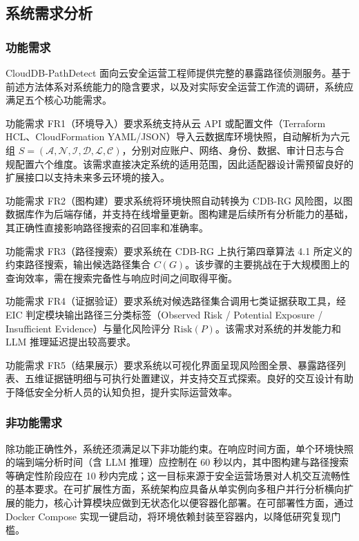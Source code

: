 \documentclass[a4paper,12pt]{ctexart}
\begin{document}
\subsection{系统需求分析}

\subsubsection{功能需求}

CloudDB-PathDetect 面向云安全运营工程师提供完整的暴露路径侦测服务。基于前述方法体系对系统能力的隐含要求，以及对实际安全运营工作流的调研，系统应满足五个核心功能需求。

功能需求 FR1（环境导入）要求系统支持从云 API 或配置文件（Terraform HCL、CloudFormation YAML/JSON）导入云数据库环境快照，自动解析为六元组 $S = (\mathcal{A}, \mathcal{N}, \mathcal{I}, \mathcal{D}, \mathcal{L}, \mathcal{C})$，分别对应账户、网络、身份、数据、审计日志与合规配置六个维度。该需求直接决定系统的适用范围，因此适配器设计需预留良好的扩展接口以支持未来多云环境的接入。

功能需求 FR2（图构建）要求系统将环境快照自动转换为 CDB-RG 风险图，以图数据库作为后端存储，并支持在线增量更新。图构建是后续所有分析能力的基础，其正确性直接影响路径搜索的召回率和准确率。

功能需求 FR3（路径搜索）要求系统在 CDB-RG 上执行第四章算法 4.1 所定义的约束路径搜索，输出候选路径集合 $C(G)$。该步骤的主要挑战在于大规模图上的查询效率，需在搜索完备性与响应时间之间取得平衡。

功能需求 FR4（证据验证）要求系统对候选路径集合调用七类证据获取工具，经 EIC 判定模块输出路径三分类标签（Observed Risk / Potential Exposure / Insufficient Evidence）与量化风险评分 $\mathrm{Risk}(P)$。该需求对系统的并发能力和 LLM 推理延迟提出较高要求。

功能需求 FR5（结果展示）要求系统以可视化界面呈现风险图全景、暴露路径列表、五维证据链明细与可执行处置建议，并支持交互式探索。良好的交互设计有助于降低安全分析人员的认知负担，提升实际运营效率。

\subsubsection{非功能需求}

除功能正确性外，系统还须满足以下非功能约束。在响应时间方面，单个环境快照的端到端分析时间（含 LLM 推理）应控制在 60 秒以内，其中图构建与路径搜索等确定性阶段应在 10 秒内完成；这一目标来源于安全运营场景对人机交互流畅性的基本要求。在可扩展性方面，系统架构应具备从单实例向多租户并行分析横向扩展的能力，核心计算模块应做到无状态化以便容器化部署。在可部署性方面，通过 Docker Compose 实现一键启动，将环境依赖封装至容器内，以降低研究复现门槛。
\end{document}
